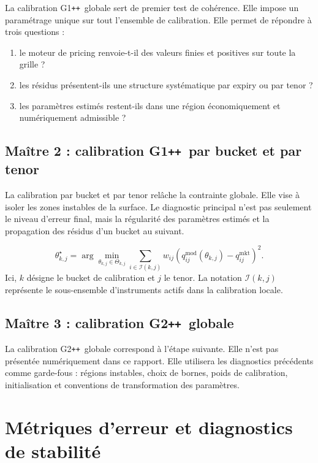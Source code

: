 \documentclass[11pt,a4paper]{article}
\newcommand{\Gpp}{G2\texttt{++}}
\newcommand{\Gopp}{G1\texttt{++}}
\begin{document}
La calibration \Gopp\ globale sert de premier test de cohérence. Elle impose un paramétrage unique sur tout l'ensemble de calibration. Elle permet de répondre à trois questions :
\begin{enumerate}
    \item le moteur de pricing renvoie-t-il des valeurs finies et positives sur toute la grille ?
    \item les résidus présentent-ils une structure systématique par expiry ou par tenor ?
    \item les paramètres estimés restent-ils dans une région économiquement et numériquement admissible ?
\end{enumerate}

\subsection{Maître 2 : calibration \Gopp\ par bucket et par tenor}

La calibration par bucket et par tenor relâche la contrainte globale. Elle vise à isoler les zones instables de la surface. Le diagnostic principal n'est pas seulement le niveau d'erreur final, mais la régularité des paramètres estimés et la propagation des résidus d'un bucket au suivant.

\begin{equation}
    \theta_{k,j}^\star
    =\arg\min_{\theta_{k,j}\in\Theta_{k,j}}
    \sum_{i\in\mathcal I(k,j)}w_{ij}
    \left(q_{ij}^{\mathrm{mod}}(\theta_{k,j})-q_{ij}^{\mathrm{mkt}}\right)^2.
\end{equation}
Ici, $k$ désigne le bucket de calibration et $j$ le tenor. La notation $\mathcal I(k,j)$ représente le sous-ensemble d'instruments actifs dans la calibration locale.

\subsection{Maître 3 : calibration \Gpp\ globale}

La calibration \Gpp\ globale correspond à l'étape suivante. Elle n'est pas présentée numériquement dans ce rapport. Elle utilisera les diagnostics précédents comme garde-fous : régions instables, choix de bornes, poids de calibration, initialisation et conventions de transformation des paramètres.

\section{Métriques d'erreur et diagnostics de stabilité}
\end{document}
